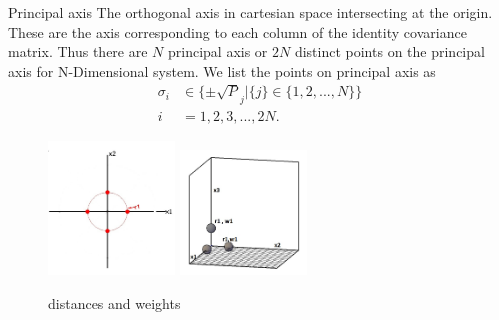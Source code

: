 \documentclass{beamer}
\begin{document}
\begin{frame}
\begin{block}{Principal axis}
The orthogonal axis in cartesian space intersecting at the origin. These are the axis corresponding to each column of the identity covariance matrix. Thus there are $N$ principal axis or $2N$ distinct points on the principal axis for N-Dimensional system.  We list the points on principal axis as 
\begin{align}
\sigma_i &\in \{\pm\sqrt{P}_j|\{j\}\in\{1,2,...,N\}\}\\
i&=1,2,3,...,2N. 
\end{align}
\end{block}
\begin{figure}[h]
	\centering
		\includegraphics[width=0.3\textwidth]{2dprincipleaxis.jpg}
		\includegraphics[width=0.3\textwidth]{3dprincipleaxis.jpg}
	\caption{distances and weights}
\end{figure}
\end{frame}
\end{document}

